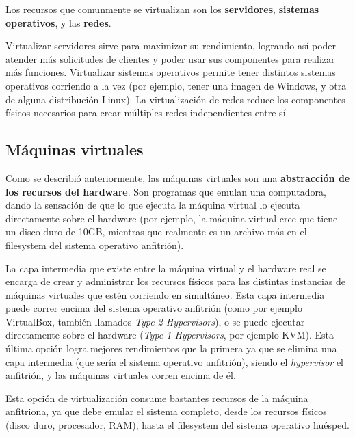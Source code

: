 \documentclass[14pt]{extarticle}
\begin{document}
        Los recursos que comunmente se virtualizan son los \textbf{servidores}, \textbf{sistemas operativos}, y las \textbf{redes}. 

        Virtualizar servidores sirve para maximizar su rendimiento, logrando así poder atender más solicitudes de clientes y poder usar sus componentes para realizar más funciones.
        Virtualizar sistemas operativos permite tener distintos sistemas operativos corriendo a la vez (por ejemplo, tener una imagen de Windows, y otra de alguna distribución Linux).
        La virtualización de redes reduce los componentes físicos necesarios para crear múltiples redes independientes entre sí.

    \subsection{Máquinas virtuales}
        Como se describió anteriormente, las máquinas virtuales son una \textbf{abstracción de los recursos del hardware}. Son programas que emulan una computadora, dando la sensación de que lo que ejecuta la máquina virtual lo ejecuta directamente sobre el hardware (por ejemplo, la máquina virtual cree que tiene un disco duro de 10GB, mientras que realmente es un archivo más en el filesystem del sistema operativo anfitrión).
        
        La capa intermedia que existe entre la máquina virtual y el hardware real se encarga de crear y administrar los recursos físicos para las distintas instancias de máquinas virtuales que estén corriendo en simultáneo.
        Esta capa intermedia puede correr encima del sistema operativo anfitrión (como por ejemplo VirtualBox, también llamados \textit{Type 2 Hypervisors}), o se puede ejecutar directamente sobre el hardware (\textit{Type 1 Hypervisors}, por ejemplo KVM)\cite{ibm}. Esta última opción logra mejores rendimientos que la primera ya que se elimina una capa intermedia (que sería el sistema operativo anfitrión), siendo el \textit{hypervisor} el anfitrión, y las máquinas virtuales corren encima de él. 

        Esta opción de virtualización consume bastantes recursos de la máquina anfitriona, ya que debe emular el sistema completo, desde los recursos físicos (disco duro, procesador, RAM), hasta el filesystem del sistema operativo huésped.
\end{document}
